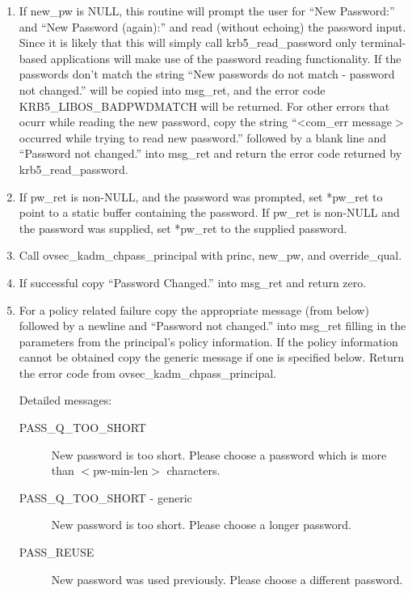 \begin{enumerate}
\item If new_pw is NULL, this routine will prompt the user for
``New Password:'' and ``New Password (again):'' and read (without
echoing) the password input. Since it is likely that this will simply
call krb5_read_password only terminal-based applications will make use
of the password reading functionality. If the passwords don't match
the string ``New passwords do not match - password not changed.'' will
be copied into msg_ret, and the error code KRB5_LIBOS_BADPWDMATCH will
be returned.  For other errors that ocurr while reading the new
password, copy the string ``<com_err message$>$ occurred while trying
to read new password.''  followed by a blank line and ``Password not
changed.'' into msg_ret and return the error code returned by
krb5_read_password.

\item If pw_ret is non-NULL, and the password was prompted, set *pw_ret to
point to a static buffer containing the password.  If pw_ret is non-NULL
and the password was supplied, set *pw_ret to the supplied password.

\item Call ovsec_kadm_chpass_principal with princ, new_pw, and override_qual.

\item If successful copy ``Password Changed.'' into msg_ret and return zero.

\item For a policy related failure copy the appropriate message (from below) 
followed by a newline and ``Password not changed.'' into msg_ret
filling in the parameters from the principal's policy information. If
the policy information cannot be obtained copy the generic message if
one is specified below. Return the error code from
ovsec_kadm_chpass_principal.

Detailed messages:
\begin{description}

\item[PASS_Q_TOO_SHORT]
New password is too short. Please choose a
password which is more than $<$pw-min-len$>$ characters.

\item[PASS_Q_TOO_SHORT - generic]
New password is too short. Please choose a longer password.

\item[PASS_REUSE]
New password was used previously. Please choose a
different password.


\end{description}
\end{enumerate}
